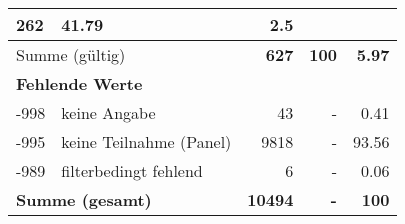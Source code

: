 \begin{longtable}{lXrrr}
       \num{262} &
       \num[round-mode=places,round-precision=2]{41,79} &
         \num[round-mode=places,round-precision=2]{2,5} \\
     \midrule
     \multicolumn{2}{l}{Summe (gültig)} &
       \textbf{\num{627}} &
     \textbf{100} &
       \textbf{\num[round-mode=places,round-precision=2]{5,97}} \\
     \multicolumn{5}{l}{\textbf{Fehlende Werte}}\\
       -998 &
       keine Angabe &
         \num{43} &
        - &
         \num[round-mode=places,round-precision=2]{0,41} \\
       -995 &
       keine Teilnahme (Panel) &
         \num{9818} &
        - &
         \num[round-mode=places,round-precision=2]{93,56} \\
       -989 &
       filterbedingt fehlend &
         \num{6} &
        - &
         \num[round-mode=places,round-precision=2]{0,06} \\
     \midrule
     \multicolumn{2}{l}{\textbf{Summe (gesamt)}} &
          \textbf{\num{10494}} &
        \textbf{-} &
        \textbf{100} \\
     \bottomrule
     \end{longtable}
     

